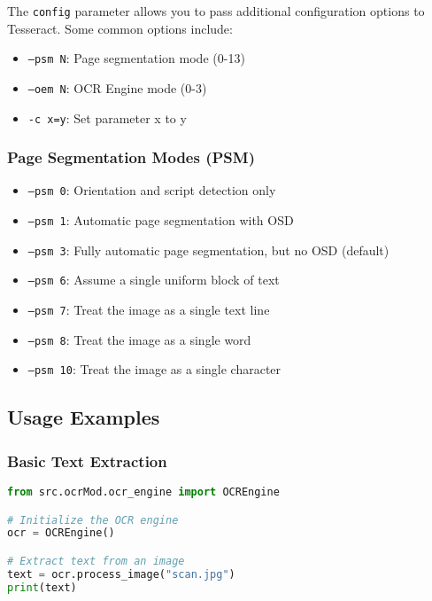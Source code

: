 The \texttt{config} parameter allows you to pass additional configuration options to Tesseract. Some common options include:

\begin{itemize}
  \item \texttt{--psm N}: Page segmentation mode (0-13)
  \item \texttt{--oem N}: OCR Engine mode (0-3)
  \item \texttt{-c x=y}: Set parameter x to y
\end{itemize}

\subsubsection{Page Segmentation Modes (PSM)}

\begin{itemize}
  \item \texttt{--psm 0}: Orientation and script detection only
  \item \texttt{--psm 1}: Automatic page segmentation with OSD
  \item \texttt{--psm 3}: Fully automatic page segmentation, but no OSD (default)
  \item \texttt{--psm 6}: Assume a single uniform block of text
  \item \texttt{--psm 7}: Treat the image as a single text line
  \item \texttt{--psm 8}: Treat the image as a single word
  \item \texttt{--psm 10}: Treat the image as a single character
\end{itemize}

\subsection{Usage Examples}

\subsubsection{Basic Text Extraction}

\begin{lstlisting}[language=Python]
from src.ocrMod.ocr_engine import OCREngine

# Initialize the OCR engine
ocr = OCREngine()

# Extract text from an image
text = ocr.process_image("scan.jpg")
print(text)
\end{lstlisting}

